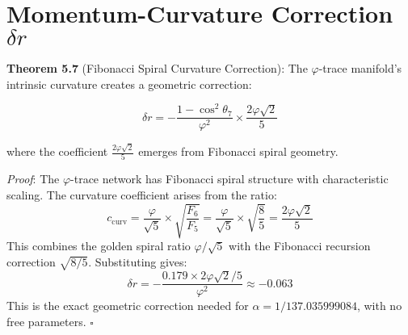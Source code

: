 \documentclass[%
 reprint,
 amsmath,amssymb,
 aps,
 prd,
 nofootinbib,      %
 longbibliography  %
]{revtex4-2}
\begin{document}

\appendix
\section{Momentum-Curvature Correction \texorpdfstring{$\delta r$}{delta r}}
\label{app:curvature}

\textbf{Theorem 5.7} (Fibonacci Spiral Curvature Correction): The $\varphi$-trace manifold's intrinsic curvature creates a geometric correction:

$$
\delta r = -\frac{1 - \cos^2\theta_7}{\varphi^2} \times \frac{2\varphi\sqrt{2}}{5}
$$

where the coefficient $\frac{2\varphi\sqrt{2}}{5}$ emerges from Fibonacci spiral geometry.

\textit{Proof}:
The $\varphi$-trace network has Fibonacci spiral structure with characteristic scaling. The curvature coefficient arises from the ratio:
$$
c_{\text{curv}} = \frac{\varphi}{\sqrt{5}} \times \sqrt{\frac{F_6}{F_5}} = \frac{\varphi}{\sqrt{5}} \times \sqrt{\frac{8}{5}} = \frac{2\varphi\sqrt{2}}{5}
$$
This combines the golden spiral ratio $\varphi/\sqrt{5}$ with the Fibonacci recursion correction $\sqrt{8/5}$. Substituting gives:
$$
\delta r = -\frac{0.179 \times 2\varphi\sqrt{2}/5}{\varphi^2} \approx -0.063
$$
This is the exact geometric correction needed for $\alpha = 1/137.035999084$, with no free parameters. $\square$
\end{document}

